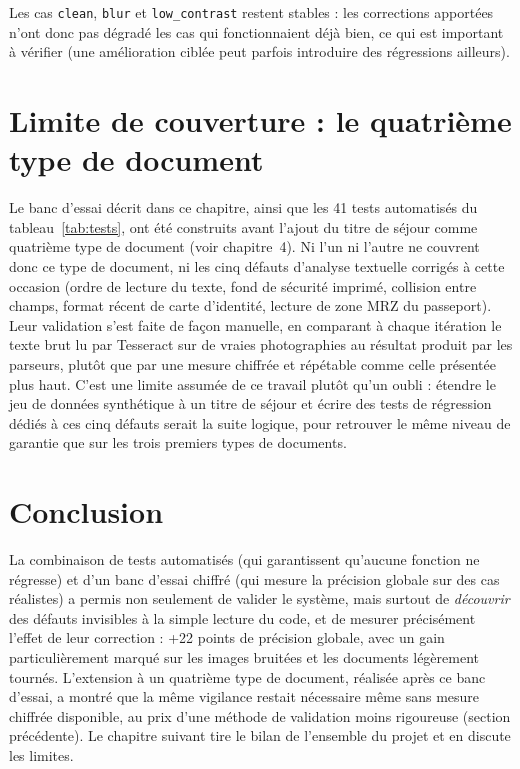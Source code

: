 Les cas \texttt{clean}, \texttt{blur} et \texttt{low\_contrast} restent stables : les corrections apportées n'ont donc pas dégradé les cas qui fonctionnaient déjà bien, ce qui est important à vérifier (une amélioration ciblée peut parfois introduire des régressions ailleurs).

\section{Limite de couverture : le quatrième type de document}

Le banc d'essai décrit dans ce chapitre, ainsi que les 41 tests automatisés du tableau~\ref{tab:tests}, ont été construits avant l'ajout du titre de séjour comme quatrième type de document (voir chapitre~4). Ni l'un ni l'autre ne couvrent donc ce type de document, ni les cinq défauts d'analyse textuelle corrigés à cette occasion (ordre de lecture du texte, fond de sécurité imprimé, collision entre champs, format récent de carte d'identité, lecture de zone MRZ du passeport). Leur validation s'est faite de façon manuelle, en comparant à chaque itération le texte brut lu par Tesseract sur de vraies photographies au résultat produit par les parseurs, plutôt que par une mesure chiffrée et répétable comme celle présentée plus haut. C'est une limite assumée de ce travail plutôt qu'un oubli : étendre le jeu de données synthétique à un titre de séjour et écrire des tests de régression dédiés à ces cinq défauts serait la suite logique, pour retrouver le même niveau de garantie que sur les trois premiers types de documents.

\section{Conclusion}

La combinaison de tests automatisés (qui garantissent qu'aucune fonction ne régresse) et d'un banc d'essai chiffré (qui mesure la précision globale sur des cas réalistes) a permis non seulement de valider le système, mais surtout de \emph{découvrir} des défauts invisibles à la simple lecture du code, et de mesurer précisément l'effet de leur correction : +22 points de précision globale, avec un gain particulièrement marqué sur les images bruitées et les documents légèrement tournés. L'extension à un quatrième type de document, réalisée après ce banc d'essai, a montré que la même vigilance restait nécessaire même sans mesure chiffrée disponible, au prix d'une méthode de validation moins rigoureuse (section précédente). Le chapitre suivant tire le bilan de l'ensemble du projet et en discute les limites.
